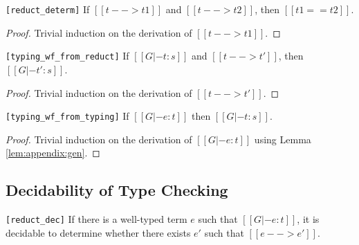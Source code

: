 \begin{lemma}\label{lem:appendix:determ}
\verb|[reduct_determ]|
    If $[[t --> t1]]$ and $[[t --> t2]]$, then $[[t1 == t2]]$.
\end{lemma}

\begin{proof}
    Trivial induction on the derivation of $[[t --> t1]]$.
\end{proof}

\begin{lemma}\label{lem:appendix:wfreduct}
\verb|[typing_wf_from_reduct]|
    If $[[G |- t:s]]$ and $[[t --> t']]$, then $[[G |- t' : s]]$.
\end{lemma}

\begin{proof}
    Trivial induction on the derivation of $[[t --> t']]$.
\end{proof}

\begin{lemma}\label{lem:appendix:corrtyp}
\verb|[typing_wf_from_typing]|
    If $[[G |- e:t]]$ then $[[G |- t : s]]$.
\end{lemma}

\begin{proof}
    Trivial induction on the derivation of $[[G |- e:t]]$ using Lemma
\ref{lem:appendix:gen}.
\end{proof}

\subsection{Decidability of Type Checking}
\begin{lemma}\label{lem:appendix:unired}
  \verb|[reduct_dec]| If there is a well-typed term $e$ such that
  $[[G |- e : t]]$, it is decidable to determine whether there exists
  $e'$ such that $[[e --> e']]$.
\end{lemma}

